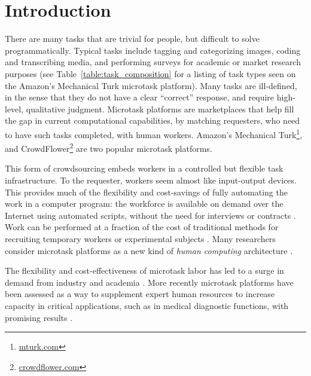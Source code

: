 \documentclass{sigchi}
\begin{document}


\section{Introduction}
There are many tasks that are trivial for people, but difficult to solve
programmatically.  
Typical tasks include tagging and categorizing images,
coding and transcribing media,
and performing surveys for 
academic or market research purposes (see Table~\ref{table:task_composition} for a listing of task types seen on the Amazon's Mechanical Turk 
microtask platform).
Many tasks are ill-defined, in the sense that they do not have
a clear ``correct'' response, and require high-level, qualitative judgment.
Microtask platforms are marketplaces that help fill the gap in current 
computational capabilities, by matching requesters, who need to have such 
tasks completed, with human workers.  Amazon's Mechanical Turk\footnote{\url{mturk.com}}, and 
CrowdFlower\footnote{\url{crowdflower.com}} are two popular microtask 
platforms.  

This form of crowdsourcing embeds workers in a controlled but flexible
task infrastructure.  
To the requester, workers seem almost like input-output devices.  
This provides much of the flexibility and 
cost-savings of fully automating the work in a computer program: 
the workforce is available on demand over the Internet using automated 
scripts, without the need for interviews or contracts 
\cite{wolfson2011look,5543192}.
Work can be performed at a fraction of the cost of traditional methods for 
recruiting temporary workers or experimental subjects
\cite{Berinsky2012351}. %
Many researchers consider microtask platforms 
as a new kind of \textit{human computing} architecture
\cite{5543192}. %

The flexibility and cost-effectiveness of microtask labor
has led to a surge in demand from industry and 
academia \cite{wolfson2011look,Berinsky2012351}.  More recently microtask 
platforms have
been assessed as a way to supplement expert human resources to increase
capacity in critical applications, such as in medical diagnostic functions,
with promising results \cite{Warby2014385}.
\end{document}
